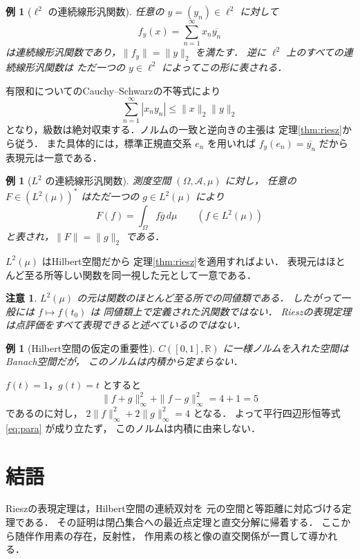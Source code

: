 \documentclass[a5paper,10pt,onecolumn]{jsarticle}
\makeatletter
\theoremstyle{mathnotetheorem}
\newtheorem{example}[theorem]{例}
\newtheorem{remark}[theorem]{注意}
\renewcommand{\proofname}{証明}
\renewenvironment{proof}[1][\proofname]{%
  \par\pushQED{\qed}\normalfont\topsep4\p@\@plus2\p@\relax
  \trivlist\item[\hskip\labelsep\bfseries #1]\ignorespaces
}{\popQED\endtrivlist\@endpefalse}
\makeatother
\begin{document}
\begin{example}[$\ell^2$ の連続線形汎関数]
任意の $y=(y_n)\in\ell^2$ に対して
\[
 f_y(x)=\sum_{n=1}^\infty x_n\overline{y_n}
\]
は連続線形汎関数であり，$\|f_y\|=\|y\|_2$ を満たす．
逆に $\ell^2$ 上のすべての連続線形汎関数は
ただ一つの $y\in\ell^2$ によってこの形に表される．
\end{example}
\begin{proof}
有限和についてのCauchy--Schwarzの不等式により
\[
 \sum_{n=1}^\infty|x_ny_n|
 \le\|x\|_2\|y\|_2
\]
となり，級数は絶対収束する．ノルムの一致と逆向きの主張は
定理\ref{thm:riesz}から従う．
また具体的には，標準正規直交系 $e_n$ を用いれば
$f_y(e_n)=\overline{y_n}$ だから表現元は一意である．
\end{proof}

\begin{example}[$L^2$ の連続線形汎関数]
測度空間 $(\Omega,\mathcal A,\mu)$ に対し，
任意の $F\in (L^2(\mu))^*$ はただ一つの
$g\in L^2(\mu)$ により
\[
 F(f)=\int_\Omega f\overline g\,d\mu
 \qquad(f\in L^2(\mu))
\]
と表され，$\|F\|=\|g\|_2$ である．
\end{example}
\begin{proof}
$L^2(\mu)$ はHilbert空間だから
定理\ref{thm:riesz}を適用すればよい．
表現元はほとんど至る所等しい関数を同一視した元として一意である．
\end{proof}

\begin{remark}
$L^2(\mu)$ の元は関数のほとんど至る所での同値類である．
したがって一般には $f\mapsto f(t_0)$ は
同値類上で定義された汎関数ではない．
Rieszの表現定理は点評価をすべて表現できると述べているのではない．
\end{remark}

\begin{example}[Hilbert空間の仮定の重要性]
$C([0,1],\mathbb R)$ に一様ノルムを入れた空間はBanach空間だが，
このノルムは内積から定まらない．
\end{example}
\begin{proof}
$f(t)=1$，$g(t)=t$ とすると
\[
 \|f+g\|_\infty^2+\|f-g\|_\infty^2=4+1=5
\]
であるのに対し，
$2\|f\|_\infty^2+2\|g\|_\infty^2=4$ となる．
よって平行四辺形恒等式 \eqref{eq:para} が成り立たず，
このノルムは内積に由来しない．
\end{proof}

\section{結語}
Rieszの表現定理は，Hilbert空間の連続双対を
元の空間と等距離に対応づける定理である．
その証明は閉凸集合への最近点定理と直交分解に帰着する．
ここから随伴作用素の存在，反射性，
作用素の核と像の直交関係が一貫して導かれる．
\end{document}
